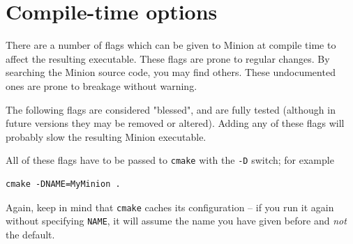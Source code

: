 \documentclass[oneside]{book}
\begin{document}
\section{Compile-time options}\label{compiletime}

There are a number of flags which can be given to Minion at compile time to
affect the resulting executable. These flags are prone to regular changes. By
searching the Minion source code, you may find others. These undocumented ones
are prone to breakage without warning.

The following flags are considered "blessed", and are fully tested (although in
future versions they may be removed or altered). Adding any of these flags
will probably slow the resulting Minion executable.

All of these flags have to be passed to \texttt{cmake} with the \verb+-D+
switch; for example
\begin{verbatim}
cmake -DNAME=MyMinion .
\end{verbatim}
Again, keep in mind that \texttt{cmake} caches its configuration -- if you run
it again without specifying \verb+NAME+, it will assume the name you have given
before and \emph{not} the default.
\end{document}

